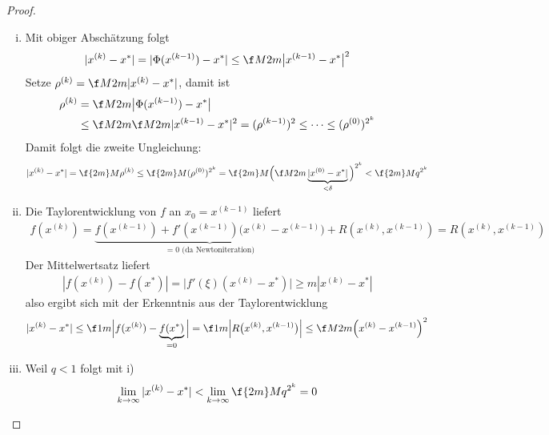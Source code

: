 \documentclass[11pt]{scrbook}
\begin{document}
\begin{st}
\begin{note}
\begin{proof}
			\begin{enumerate}[i)]
				\item
					Mit obiger Abschätzung folgt
					\begin{align*}
						|x^{(k)}-x^*| = |\Phi(x^{(k-1)}) - x^*| \le \f M{2m} \big|x^{(k-1)} - x^*\big|^2
					\end{align*}
					Setze $\rho^{(k)} = \f M{2m}|x^{(k)}-x^*|$, damit ist
					\begin{align*}
						\rho^{(k)} 
						&= \f M{2m} \big| \Phi(x^{(k-1)}) - x^*\big| \\
						&\le \f M{2m} \f M{2m} |x^{(k-1)} - x^*|^2 
						= (\rho^{(k-1)})^2 
						\le \dotsb \le
						(\rho^{(0)})^{2^k}
					\end{align*}
					Damit folgt die zweite Ungleichung:
					\begin{align*}
						|x^{(k)} - x^*|
						= \f {2m}M \rho^{(k)}
						\le \f {2m}M (\rho^{(0)})^{2^k}
						= \f {2m}M \Big( \f M{2m} \underbrace{|x^{(0)}-x^*|}_{< \delta} \Big)^{2^k}
						< \f {2m}M q^{2^k}
					\end{align*}
				\item
					Die Taylorentwicklung von $f$ an $x_0 = x^{(k-1)}$ liefert
					\begin{align*}
						f(x^{(k)}) = \underbrace{f(x^{(k-1)}) + f'(x^{(k-1)})\big(x^{(k)}-x^{(k-1)}\big)}_{=0 \text{ (da Newtoniteration)}} + R(x^{(k)},x^{(k-1)}) = R(x^{(k)},x^{(k-1)})
					\end{align*}
					Der Mittelwertsatz liefert
					\begin{align*}
						|f(x^{(k)}) -f(x^*)| = \big|f'(\xi)(x^{(k)}-x^*)\big| \ge m|x^{(k)} -x^*|
					\end{align*}
					also ergibt sich mit der Erkenntnis aus der Taylorentwicklung
					\begin{align*}
						|x^{(k)} -x^*|
						\le \f 1m \Big|f(x^{(k)}) - \underbrace{f(x^*)}_{=0}\Big|
						= \f 1m \Big|R\big(x^{(k)}, x^{(k-1)}\big) \Big|
						\le \f M{2m} \Big(x^{(k)} -x^{(k-1)}\Big)^2
					\end{align*}
				\item
					Weil $q<1$ folgt mit i)
					\begin{align*}
						\lim_{k\to \infty} |x^{(k)} -x^*| < \lim_{k\to \infty} \f {2m}M q^{2^k} = 0
					\end{align*}
			\end{enumerate}
		\end{proof}
	\end{note}
\end{st}
\end{document}
